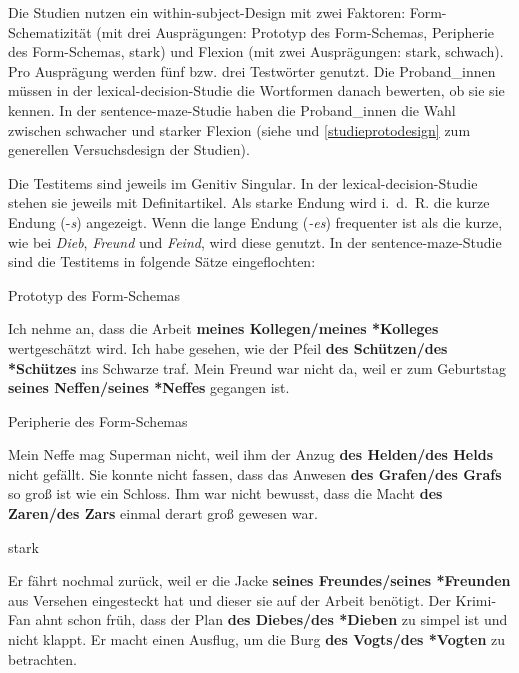 Die Studien nutzen ein within-subject-Design mit zwei Faktoren: Form-Sche\-ma\-ti\-zi\-tät (mit drei Ausprägungen: Prototyp des Form-Schemas, Peripherie des Form-Schemas, stark) und Flexion (mit zwei Ausprägungen: stark, schwach). Pro Ausprägung werden fünf bzw. drei Testwörter genutzt. Die Proband\_innen müssen in der lexical-decision-Studie die Wortformen danach bewerten, ob sie sie kennen. In der sentence-maze-Studie haben die Proband\_innen die Wahl zwischen schwacher und starker Flexion (siehe  und \ref{studieprotodesign} zum generellen Versuchsdesign der Studien). 



Die Testitems sind jeweils im Genitiv Singular. In der lexical-decision-Studie stehen sie jeweils mit Definitartikel. Als starke Endung wird i.~d.~R. die kurze Endung (-\textit{s}) angezeigt. Wenn die lange Endung (\textit{-es}) frequenter ist als die kurze, wie bei \textit{Dieb}, \textit{Freund} und \textit{Feind}, wird diese genutzt. In der sentence-maze-Studie sind die Testitems in folgende Sätze eingeflochten:

\begin{exe}
\ex Prototyp des Form-Schemas
\begin{xlist}
\ex Ich nehme an, dass die Arbeit \textbf{meines Kollegen/meines *Kolleges} wertgeschätzt wird.
\ex Ich habe gesehen, wie der Pfeil \textbf{des Schützen/des *Schützes} ins Schwarze traf.
\ex\sloppy Mein Freund war nicht da, weil er zum Geburtstag \textbf{seines Neffen\slash seines *Neffes} gegangen ist.
\end{xlist} 
\ex Peripherie des Form-Schemas
\begin{xlist}
\ex Mein Neffe mag Superman nicht, weil ihm der Anzug \textbf{des Helden/des Helds} nicht gefällt.
\ex Sie konnte nicht fassen, dass das Anwesen \textbf{des Grafen/des Grafs} so groß ist wie ein Schloss.
\ex Ihm war nicht bewusst, dass die Macht \textbf{des Zaren/des Zars} einmal derart groß gewesen war.
\end{xlist}
\ex stark
\begin{xlist}
\ex Er fährt nochmal zurück, weil er die Jacke \textbf{seines Freundes/seines *Freunden} aus Versehen eingesteckt hat und dieser sie auf der Arbeit benötigt.
\ex Der Krimi-Fan ahnt schon früh, dass der Plan \textbf{des Diebes/des *Dieben} zu simpel ist und nicht klappt.
\ex Er macht einen Ausflug, um die Burg \textbf{des Vogts/des *Vogten} zu betrachten.
\end{xlist}
\end{exe}

